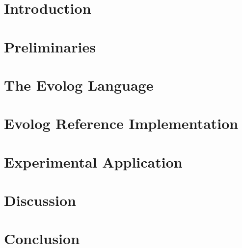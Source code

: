 \documentclass[draft,final]{vutinfth} %
\theoremstyle{definition}
\begin{document}

\tableofcontents %

\mainmatter

\chapter{Introduction}

\chapter{Preliminaries}


\chapter{The Evolog Language}
\label{chap:language}


\chapter{Evolog Reference Implementation}
\label{chap:implementation}


\chapter{Experimental Application}
\label{chap:application-experiment}


\chapter{Discussion}
\label{chap:discussion}


\chapter{Conclusion}
\label{chap:conclusion}


\appendix


\backmatter

\listoffigures %

\cleardoublepage %
\listoftables %

\listofalgorithms
{}

\printindex

\printglossaries



\end{document}

